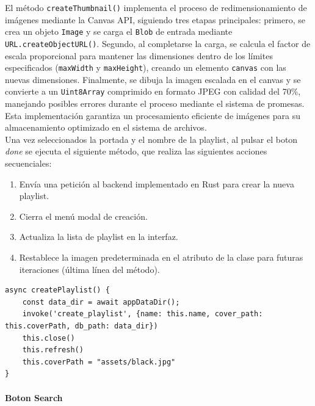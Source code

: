 \documentclass[11pt, a4paper]{article}
\begin{document}
                El método \texttt{createThumbnail()} implementa el proceso de redimensionamiento de imágenes mediante la Canvas API, siguiendo tres etapas principales: primero, se crea un objeto \texttt{Image} y se carga el \texttt{Blob} de entrada mediante \texttt{URL.createObjectURL()}. Segundo, al completarse la carga, se calcula el factor de escala proporcional para mantener las dimensiones dentro de los límites especificados (\texttt{maxWidth} y \texttt{maxHeight}), creando un elemento \texttt{canvas} con las nuevas dimensiones. Finalmente, se dibuja la imagen escalada en el canvas y se convierte a un \texttt{Uint8Array} comprimido en formato JPEG con calidad del 70\%, manejando posibles errores durante el proceso mediante el sistema de promesas. Esta implementación garantiza un procesamiento eficiente de imágenes para su almacenamiento optimizado en el sistema de archivos. \\

                Una vez seleccionados la portada y el nombre de la playlist, al pulsar el boton \textit{done} se ejecuta el siguiente método, que realiza las siguientes acciones secuenciales:

                \begin{enumerate}
                    \item Envía una petición al backend implementado en Rust para crear la nueva playlist.
                    \item Cierra el menú modal de creación.
                    \item Actualiza la lista de playlist en la interfaz.
                    \item Restablece la imagen predeterminada en el atributo de la clase para futuras iteraciones (última línea del método).
                \end{enumerate}

                \begin{lstlisting}[caption={createPlaylist()}]
async createPlaylist() {
    const data_dir = await appDataDir();
    invoke('create_playlist', {name: this.name, cover_path: this.coverPath, db_path: data_dir})
    this.close()
    this.refresh()
    this.coverPath = "assets/black.jpg"
}
                \end{lstlisting}

                \paragraph{Boton Search}
\end{document}
